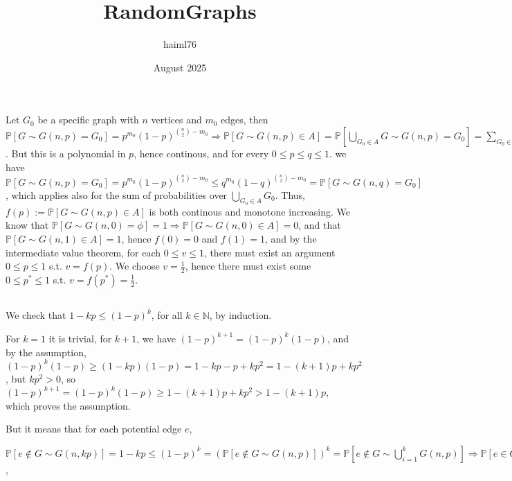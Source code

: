 \documentclass{article}
\title{RandomGraphs}
\author{haiml76 }
\date{August 2025}
\begin{document}
\maketitle

\section{}
\subsection{}
Let $G_0$ be a specific graph with $n$ vertices and $m_0$ edges, then $\mathbb{P}[G\sim{G(n,p)}=G_0]=p^{m_0}(1-p)^{\binom{n}{2}-m_0}\Rightarrow{\mathbb{P}[G\sim{G(n,p)}\in{A}]}=\mathbb{P}[\bigcup_{G_0\in{A}}G\sim{G(n,p)}=G_0]=\sum_{G_0\in{A}}p^{m_0}(1-p)^{\binom{n}{2}-m_0}$. But this is a polynomial in $p$, hence continous, and for every $0\leq{p\leq{q}}\leq{1}$. we have $\mathbb{P}[G\sim{G(n,p)}=G_0]=p^{m_0}(1-p)^{\binom{n}{2}-m_0}\leq{q^{m_0}(1-q)^{\binom{n}{2}-m_0}}=\mathbb{P}[G\sim{G(n,q)}=G_0]$, which applies also for the sum of probabilities over $\bigcup_{G_0\in{A}}G_0$. Thus, $f(p):=\mathbb{P}[G\sim{G(n,p)}\in{A}]$ is both continous and monotone increasing. We know that $\mathbb{P}[G\sim{G(n,0)}=\phi]=1\Rightarrow{\mathbb{P}[G\sim{G(n,0)}\in{A}]=0}$, and that $\mathbb{P}[G\sim{G(n,1)}\in{A}]=1$, hence $f(0)=0$ and $f(1)=1$, and by the intermediate value theorem, for each $0\leq{v}\leq{1}$, there must exist an argument $0\leq{p}\leq{1}$ s.t. $v=f(p)$. We choose $v=\frac{1}{2}$, hence there must exist some $0\leq{p^{\ast}}\leq{1}$ s.t. $v=f(p^{\ast})=\frac{1}{2}.$
\subsection{}
We check that $1-kp\leq{(1-p)^k}$, for all $k\in\mathbb{N}$, by induction.

For $k=1$ it is trivial, for $k+1$, we have $(1-p)^{k+1}=(1-p)^k(1-p)$, and by the assumption, $(1-p)^k(1-p)\geq{(1-kp)(1-p)}=1-kp-p+kp^2=1-(k+1)p+kp^2$, but $kp^2>0$, so $(1-p)^{k+1}=(1-p)^k(1-p)\geq{1-(k+1)p+kp^2}>1-(k+1)p$, which proves the assumption.

But it means that for each potential edge $e$, 

$\mathbb{P}[e\notin{G\sim{G(n,kp)}}]=1-kp\leq(1-p)^k=(\mathbb{P}[e\notin{G\sim{G(n,p)}}])^k=\mathbb{P}[e\notin{G\sim\bigcup_{i=1}^{k}G(n,p)}]\Rightarrow{\mathbb{P}[e\in{G\sim{G(n,kp)}}]\geq{\mathbb{P}[e\in{G\sim\bigcup_{i=1}^{k}G(n,p)]}}}$, 
\end{document}
